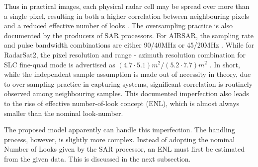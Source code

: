 \documentclass[journal]{IEEEtran}
\begin{document}
Thus in practical images, each physical radar cell may be spread over more than a single pixel,
resulting in both %
  a higher correlation between neighbouring pixels \cite{Raney_1988_TGRS_666} %
  and a reduced effective number of looks\cite{Lee_1994_TGRS_1017} \cite{Anfinsen_2009_TGRS_3795}. 
The oversampling practice is also documented by the producers of SAR processors.
For AIRSAR, the sampling rate and pulse bandwidth combinations are either 90/40MHz or 45/20MHz \cite{JPL_2013_Web_AIRSAR_Impl}.
While for RadarSat2, the pixel resolution and range - azimuth resolution combination for SLC fine-quad mode is advertised as $(4.7 \cdot 5.1)m^2/(5.2 \cdot 7.7)m^2$ \cite{MDA_2013_Web_RadatSat2_Description}.
In short, while the independent sample assumption is made out of necessity in theory,
  due to over-sampling practice in capturing systems, significant correlation is routinely observed among neighbouring samples. %
This documented imperfection also leads to the rise of effective number-of-look concept (ENL),
  which is almost always smaller than the nominal look-number. 

The proposed model apparently can handle this imperfection. %
The handling process, however, is slightly more complex.
Instead of adopting the nominal Number of Looks given by the SAR processor,
  an ENL must first be estimated from the given data.
This is discussed in the next subsection.
\end{document}
